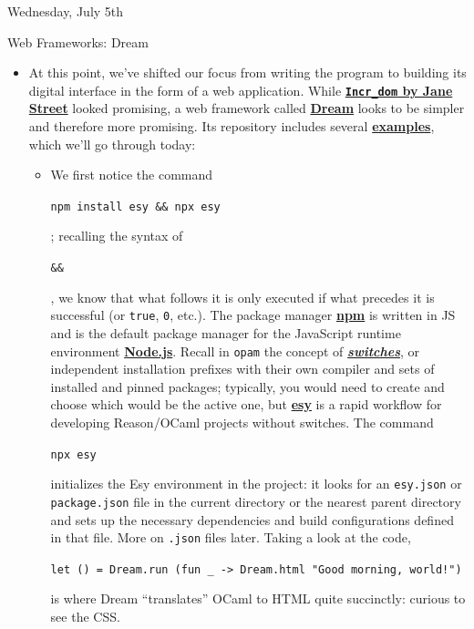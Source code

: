 \documentclass[11pt]{article}
\newcommand\codebox[1]{
    \noindent\hspace{-0.25em}\begin{tcolorbox}[on line, hbox, colback = codeblack, colframe = codeborder, coltext = white, boxrule = 1.5pt, left = 2pt, right = 2pt, top = 0.5pt, bottom = 0.5pt]
    \small\texttt{#1}\normalsize
    \end{tcolorbox}\hspace{-0.25em}
}
\begin{document}
\begin{hulkgreenbox}{Wednesday, July 5th\vspace{-2.2em}\begin{flushright}Web Frameworks: Dream \end{flushright}}
    \begin{itemize}
        \item At this point, we've shifted our focus from writing the program to building its digital interface in the form of a web application. While \href{https://opensource.janestreet.com/incr_dom/}{\textbf{\texttt{Incr\_dom} by Jane Street}} looked promising, a web framework called \href{https://aantron.github.io/dream/}{\textbf{Dream}} looks to be simpler and therefore more promising. Its repository includes several \href{https://github.com/aantron/dream/tree/master/example}{\textbf{examples}}, which we'll go through today:
        \begin{itemize}
            \item\href{https://github.com/aantron/dream/tree/master/example/1-hello}{} We first notice the command \codebox{npm install esy \&\& npx esy}; recalling the syntax of \codebox{\&\&}, we know that what follows it is only executed if what precedes it is successful (or \texttt{true}, \texttt{0}, etc.). The package manager \href{https://www.npmjs.com/}{\textbf{npm}} is written in JS and is the default package manager for the JavaScript runtime environment \href{https://nodejs.org/en}{\textbf{Node.js}}. Recall in \texttt{opam} the concept of \href{https://opam.ocaml.org/doc/man/opam-switch.html}{\textbf{\textit{switches}}}, or independent installation prefixes with their own compiler and sets of installed and pinned packages; typically, you would need to create and choose which would be the active one, but \href{https://esy.sh/docs/en/what-why.html}{\textbf{esy}} is a rapid workflow for developing Reason/OCaml projects without switches. The command \codebox{npx esy} initializes the Esy environment in the project: it looks for an \texttt{esy.json} or \texttt{package.json} file in the current directory or the nearest parent directory and sets up the necessary dependencies and build configurations defined in that file. More on \texttt{.json} files later. Taking a look at the code, \codebox{let () = Dream.run (fun \_ -> Dream.html "Good morning, world!")} is where Dream ``translates'' OCaml to HTML quite succinctly: curious to see the CSS.
        \end{itemize}
    \end{itemize}
\end{hulkgreenbox}
\end{document}
